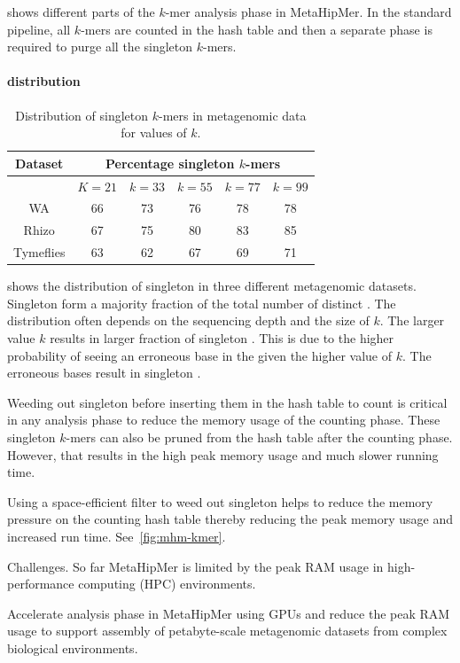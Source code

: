  shows different parts of the $k$-mer analysis phase in
MetaHipMer. In the standard pipeline, all $k$-mers are counted in the hash table and then a separate phase is required to purge all the singleton $k$-mers.

\paragraph{\Kmer distribution}

\begin{table}
\centering
    \begin{tabular}{c | c | c | c | c | c}
    \toprule
    \textbf{Dataset} & \multicolumn{5}{c}{\textbf{Percentage singleton $k$-mers}} \\
    \midrule
    & $K=21$ & $k=33$ & $k=55$ & $k=77$ & $k=99$ \\
    \midrule
    WA &  66 & 73 & 76 & 78 & 78  \\
    Rhizo &  67 & 75 & 80 & 83 & 85  \\
    Tymeflies & 63 & 62 & 67 & 69 & 71 \\
    \bottomrule
    \end{tabular}
    \caption{Distribution of singleton $k$-mers in metagenomic data for values of $k$.}
    \label{tab:kmer-dist}
\end{table}

 shows the distribution of singleton \kmers in three
different metagenomic datasets. Singleton \kmers form a majority fraction of
the total number of distinct \kmers. The distribution often depends on the
sequencing depth and the size of $k$. The larger value $k$ results in larger
fraction of singleton \kmers. This is due to the higher probability of seeing
an erroneous base in the \kmer given the higher value of $k$. The erroneous
bases result in singleton \kmers.

Weeding out singleton \kmers before inserting them in the hash table to count
is critical in any \kmer analysis phase to reduce the memory usage of the
counting phase. These singleton $k$-mers can also be pruned from the hash table
after the counting phase. However, that results in the high peak memory usage
and much slower running time.

Using a space-efficient filter to weed out singleton \kmers helps to reduce
the memory pressure on the counting hash table thereby reducing the peak memory
usage and increased run time. See~\cref{fig:mhm-kmer}.


\noindent
{Challenges.}
So far MetaHipMer is limited by the peak RAM usage in high-performance computing (HPC) environments.

\begin{rproblem}
Accelerate \kmer analysis phase in MetaHipMer using GPUs and reduce the peak RAM usage to support assembly of petabyte-scale metagenomic datasets from complex biological environments.
\label{rprob:peppermint4}
\end{rproblem}


